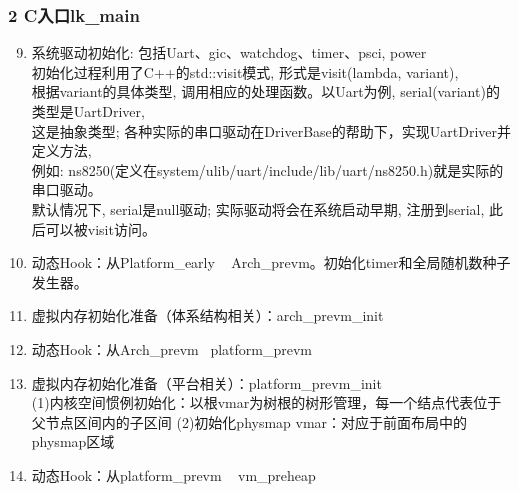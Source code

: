 \documentclass[
8pt, %
]{beamer}
\begin{document}
	\begin{frame}
		\frametitle{2 C入口lk\_main}
		\begin{enumerate}\setcounter{enumi}{8}
			\item 系统驱动初始化: 包括Uart、gic、watchdog、timer、psci, power\\
            初始化过程利用了C++的std::visit模式, 形式是visit(lambda, variant), \\
            根据variant的具体类型, 调用相应的处理函数。以Uart为例, serial(variant)的类型是UartDriver,\\
            这是抽象类型; 各种实际的串口驱动在DriverBase的帮助下，实现UartDriver并定义方法, \\
            例如: ns8250(定义在system/ulib/uart/include/lib/uart/ns8250.h)就是实际的串口驱动。\\
            默认情况下, serial是null驱动; 实际驱动将会在系统启动早期, 注册到serial, 此后可以被visit访问。
			\item 动态Hook：从Platform\_early ~ Arch\_prevm。初始化timer和全局随机数种子发生器。
			\item 虚拟内存初始化准备（体系结构相关）：arch\_prevm\_init
			\item 动态Hook：从Arch\_prevm ~platform\_prevm
			\item 虚拟内存初始化准备（平台相关）：platform\_prevm\_init\\
			(1)内核空间惯例初始化：以根vmar为树根的树形管理，每一个结点代表位于父节点区间内的子区间
			(2)初始化physmap vmar：对应于前面布局中的physmap区域
			\item 动态Hook：从platform\_prevm ~ vm\_preheap
		\end{enumerate}
	\end{frame}
\end{document}
